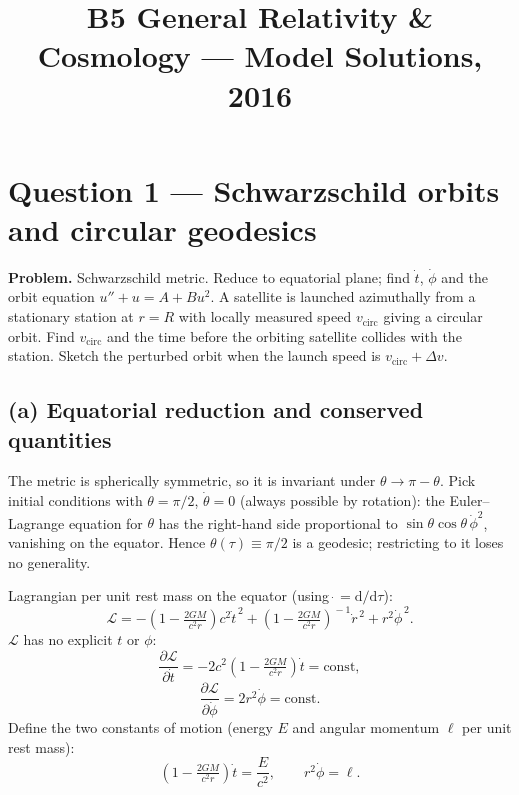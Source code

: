 \documentclass[11pt]{article}
\title{B5 General Relativity \& Cosmology --- Model Solutions, 2016}
\author{}
\date{}
\newcommand{\de}{\mathrm{d}}
\newcommand{\pd}[2]{\frac{\partial #1}{\partial #2}}
\begin{document}
\maketitle

\section*{Question 1 --- Schwarzschild orbits and circular geodesics}

\textbf{Problem.} Schwarzschild metric. Reduce to equatorial plane; find $\dot t$, $\dot\phi$ and the orbit equation $u'' + u = A + B u^2$. A satellite is launched azimuthally from a stationary station at $r=R$ with locally measured speed $v_\text{circ}$ giving a circular orbit. Find $v_\text{circ}$ and the time before the orbiting satellite collides with the station. Sketch the perturbed orbit when the launch speed is $v_\text{circ}+\Delta v$.

\subsection*{(a) Equatorial reduction and conserved quantities}

The metric is spherically symmetric, so it is invariant under $\theta\to\pi-\theta$. Pick initial conditions with $\theta=\pi/2$, $\dot\theta=0$ (always possible by rotation): the Euler--Lagrange equation for $\theta$ has the right-hand side proportional to $\sin\theta\cos\theta\,\dot\phi^2$, vanishing on the equator. Hence $\theta(\tau)\equiv\pi/2$ is a geodesic; restricting to it loses no generality.

Lagrangian per unit rest mass on the equator (using $\dot{\,}=\de/\de\tau$):
\begin{equation}
\mathcal L = -\!\left(1-\tfrac{2GM}{c^2 r}\right)\!c^2\dot t^{\,2} + \!\left(1-\tfrac{2GM}{c^2 r}\right)^{\!-1}\!\dot r^{\,2} + r^2\dot\phi^{\,2}.
\label{eq:lag}
\end{equation}
$\mathcal L$ has no explicit $t$ or $\phi$:
\[
\pd{\mathcal L}{\dot t} = -2c^2\!\left(1-\tfrac{2GM}{c^2 r}\right)\!\dot t = \text{const},
\]
\[
\pd{\mathcal L}{\dot\phi} = 2 r^2\dot\phi = \text{const}.
\]
Define the two constants of motion (energy $E$ and angular momentum $\ell$ per unit rest mass):
\begin{equation}
\boxed{\;\!\left(1-\tfrac{2GM}{c^2 r}\right)\!\dot t = \frac{E}{c^2},\qquad r^2\dot\phi = \ell.\;}
\label{eq:Eell}
\end{equation}
\end{document}
